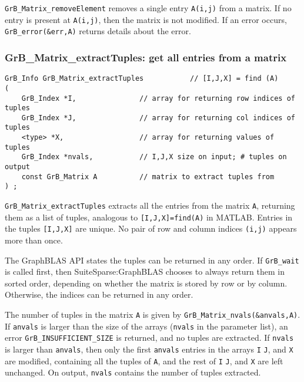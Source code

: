 \documentclass[12pt]{article}
\begin{document}
\verb'GrB_Matrix_removeElement' removes a single entry \verb'A(i,j)' from a
matrix.  If no entry is present at \verb'A(i,j)', then the matrix is not
modified.  If an error occurs, \verb'GrB_error(&err,A)' returns details about
the error.

\subsubsection{{\sf GrB\_Matrix\_extractTuples:} get all entries from a matrix}
\label{matrix_extractTuples}

\begin{mdframed}[userdefinedwidth=6in]
{\footnotesize
\begin{verbatim}
GrB_Info GrB_Matrix_extractTuples           // [I,J,X] = find (A)
(
    GrB_Index *I,               // array for returning row indices of tuples
    GrB_Index *J,               // array for returning col indices of tuples
    <type> *X,                  // array for returning values of tuples
    GrB_Index *nvals,           // I,J,X size on input; # tuples on output
    const GrB_Matrix A          // matrix to extract tuples from
) ;
\end{verbatim} } \end{mdframed}

\verb'GrB_Matrix_extractTuples' extracts all the entries from the matrix
\verb'A', returning them as a list of tuples, analogous to
\verb'[I,J,X]=find(A)' in MATLAB.  Entries in the tuples \verb'[I,J,X]' are
unique.  No pair of row and column indices \verb'(i,j)' appears more than once.

The GraphBLAS API states the tuples can be returned in any order.  If
\verb'GrB_wait' is called first, then SuiteSparse:GraphBLAS chooses to
always return them in sorted order, depending on whether the matrix is stored
by row or by column.  Otherwise, the indices can be returned in any order.

The number of tuples in the matrix \verb'A' is given by
\verb'GrB_Matrix_nvals(&anvals,A)'.  If \verb'anvals' is larger than the size
of the arrays (\verb'nvals' in the parameter list), an error
\verb'GrB_INSUFFICIENT_SIZE' is returned, and no tuples are extracted.  If
\verb'nvals' is larger than \verb'anvals', then only the first \verb'anvals'
entries in the arrays \verb'I' \verb'J', and \verb'X' are modified, containing
all the tuples of \verb'A', and the rest of \verb'I' \verb'J', and \verb'X' are
left unchanged.  On output, \verb'nvals' contains the number of tuples
extracted.
\end{document}
